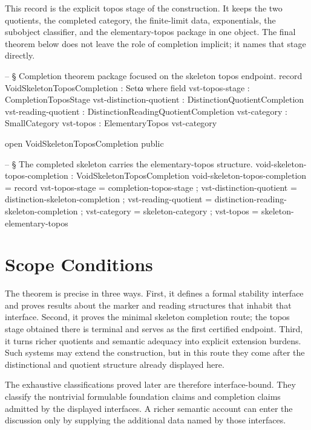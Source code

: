 \documentclass[11pt]{article}
\begin{document}
This record is the explicit topos stage of the construction.  It keeps the two
quotients, the completed category, the finite-limit data, exponentials,
the subobject classifier, and the elementary-topos package in one object.
The final theorem below does not leave the role of completion implicit;
it names that stage directly.

\begin{code}
-- § Completion theorem package focused on the skeleton topos endpoint.
record VoidSkeletonToposCompletion : Setω where
  field
    vst-topos-stage          : CompletionToposStage
    vst-distinction-quotient : DistinctionQuotientCompletion
    vst-reading-quotient     : DistinctionReadingQuotientCompletion
    vst-category             : SmallCategory
    vst-topos                : ElementaryTopos vst-category

open VoidSkeletonToposCompletion public

-- § The completed skeleton carries the elementary-topos structure.
void-skeleton-topos-completion : VoidSkeletonToposCompletion
void-skeleton-topos-completion = record
  { vst-topos-stage          = completion-topos-stage
  ; vst-distinction-quotient = distinction-skeleton-completion
  ; vst-reading-quotient     = distinction-reading-skeleton-completion
  ; vst-category             = skeleton-category
  ; vst-topos                = skeleton-elementary-topos
  }
\end{code}

\section{Scope Conditions}

The theorem is precise in three ways.  First, it defines a formal
stability interface and proves results about the marker and reading
structures that inhabit that interface.  Second, it proves the minimal
skeleton completion route; the topos stage obtained there is terminal and
serves as the first certified endpoint.  Third, it turns richer
quotients and semantic adequacy into explicit extension burdens.  Such
systems may extend the construction, but in this route they come after
the distinctional and quotient structure already displayed here.

The exhaustive classifications proved later are therefore
interface-bound.  They classify the nontrivial formulable foundation
claims and completion claims admitted by the displayed interfaces.  A
richer semantic account can enter the discussion only by supplying the
additional data named by those interfaces.
\end{document}
